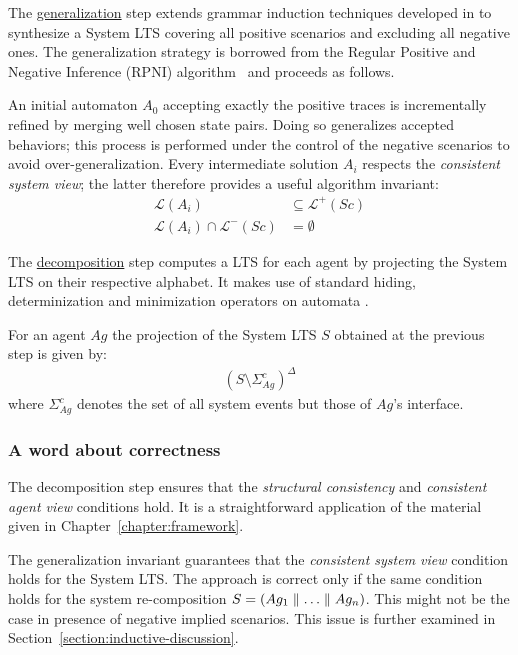 The \underline{generalization} step extends grammar induction techniques developed in \cite{Oncina:1992} to synthesize a System LTS covering all positive scenarios and excluding all negative ones. The generalization strategy is borrowed from the Regular Positive and Negative Inference (RPNI) algorithm~\cite{Oncina:1992} and proceeds as follows.

An initial automaton $A_0$ accepting exactly the positive traces is incrementally refined by merging well chosen state pairs.
Doing so generalizes accepted behaviors; this process is performed under the control of the negative scenarios to avoid over-generalization. Every intermediate solution $A_i$ respects the \emph{consistent system view}; the latter therefore provides a useful algorithm invariant:
\begin{align*}
\mathcal{L}(A_i) &\subseteq \mathcal{L}^+(Sc)\\
\mathcal{L}(A_i) \cap \mathcal{L}^-(Sc) &= \emptyset
\end{align*}

The \underline{decomposition} step computes a LTS for each agent by projecting the System LTS on their respective alphabet. It makes use of standard hiding, determinization and minimization operators on automata \cite{Hopcroft:1979}. 

For an agent $Ag$ the projection of the System LTS $S$ obtained at the previous step is given by:
\begin{align}
(S \setminus \Sigma_{Ag}^c)^\Delta
\end{align}
\noindent where $\Sigma_{Ag}^c$ denotes the set of all system events but those of $Ag$'s interface.

\subsubsection*{A word about correctness}

The decomposition step ensures that the \emph{structural consistency} and \emph{consistent agent view} conditions hold. It is a straightforward application of the material given in Chapter~\ref{chapter:framework}. 

The generalization invariant guarantees that the \emph{consistent system view} condition holds for the System LTS. The approach is correct only if the same condition holds for the system re-composition $S = (Ag_1 \parallel \ldots \parallel Ag_n)$. This might not be the case in presence of negative implied scenarios. This issue is further examined in Section~\ref{section:inductive-discussion}.

